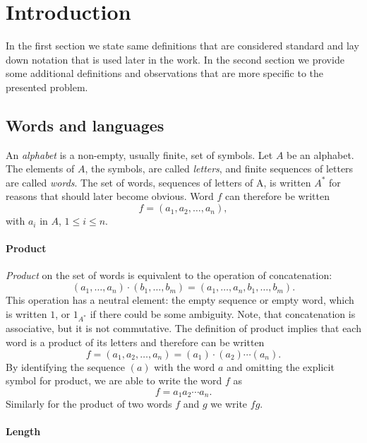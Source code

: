 \chapter{Introduction}

In the first section we state same definitions that are considered standard and lay down notation that is used later in the work. In the second section we provide some additional definitions and observations that are more specific to the presented problem.


\section{Words and languages}

An \emph{alphabet} is a non-empty, usually finite, set of symbols. Let $A$ be an alphabet. The elements of $A$, the symbols, are called \emph{letters}, and finite sequences of letters are called \emph{words}. The set of words, sequences of letters of A, is written $A^*$ for reasons that should later become obvious. Word $f$ can therefore be written
\[
    f = (a_1, a_2, \dotsc, a_n),
\]
with $a_i$ in $A$, $1 \leq i \leq n$.

\subsubsection*{Product}

\emph{Product} on the set of words is equivalent to the operation of concatenation:
\[
    (a_1, \dotsc, a_n) \cdot (b_1, \dotsc, b_m) = (a_1, \dotsc, a_n, b_1, \dotsc, b_m).
\]
This operation has a neutral element: the empty sequence or empty word, which is written $1$, or $1_{A^*}$ if there could be some ambiguity. Note, that concatenation is associative, but it is not commutative. The definition of product implies that each word is a product of its letters and therefore can be written
\[
    f = (a_1, a_2, \dotsc, a_n) = (a_1) \cdot (a_2) \dotsm (a_n).
\]
By identifying the sequence $(a)$ with the word $a$ and omitting the explicit symbol for product, we are able to write the word $f$ as
\[
    f = a_1 a_2 \dotsm a_n.
\]
Similarly for the product of two words $f$ and $g$ we write $fg$.

\subsubsection*{Length}

